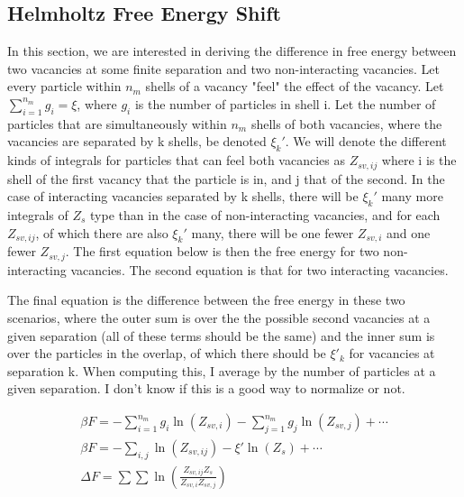 \documentclass[paper=a4, fontsize=11pt]{scrartcl} %
\numberwithin{equation}{section} %
\numberwithin{figure}{section} %
\numberwithin{table}{section} %
\begin{document}
\subsection{Helmholtz Free Energy Shift}
In this section, we are interested in deriving the difference in free energy
between two vacancies at some finite separation and two non-interacting vacancies.
Let every particle within $n_m$ shells of a vacancy "feel" the effect of the
vacancy.  Let $\sum\limits_{i=1}^{n_m} g_i = \xi$, where $g_i$ is the number
of particles in shell i. Let the number of particles that are simultaneously
within $n_m$ shells of both vacancies, where the vacancies are separated by
k shells, be denoted $\xi_k'$.  We will denote the different kinds of integrals
for particles that can feel both vacancies as $Z_{sv,ij}$ where i is the
shell of the first vacancy that the particle is in, and j that of the second.
In the case of interacting vacancies separated by k shells, there will be 
$\xi_k'$ many more integrals of $Z_s$ type than in the case of non-interacting
vacancies, and for each $Z_{sv,ij}$, of which there are also $\xi_k'$ many,
there will be one fewer $Z_{sv,i}$ and one fewer $Z_{sv,j}$.  The first equation below is then the free energy for two non-interacting vacancies.  The second equation is that for two interacting vacancies.  

The final equation is the difference between the free
energy in these two scenarios, where the outer sum is over the the possible second vacancies at a given separation (all of these terms should be the same) and the inner sum is over the particles in the overlap, of which there should be $\xi'_k$ for vacancies at separation k.  When computing this, I average by the number of particles at a given separation.  I don't know if this is a good way to normalize or not.  

\begin{align}
  \beta F = -\sum\limits_{i=1}^{n_m} g_i \ln(Z_{sv,i}) - 
             \sum\limits_{j=1}^{n_m} g_j \ln(Z_{sv,j}) + \cdots\\
  \beta F = -\sum\limits_{i,j}\ln(Z_{sv,ij})-\xi'\ln(Z_s) + \cdots\\
  \Delta F = \sum\sum \ln\left(\frac{Z_{sv,ij}Z_s}{Z_{sv,i}Z_{sv,j}}\right)
\end{align}

\end{document}
